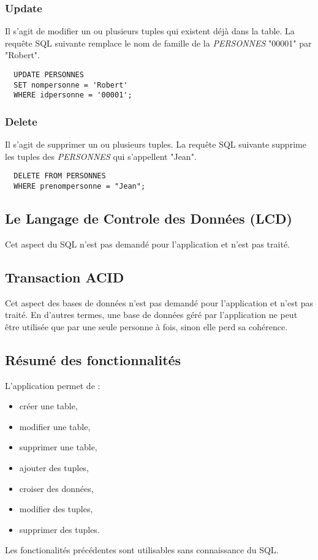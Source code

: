 \subsubsection{Update}
Il s'agit de modifier un ou plusieurs tuples qui existent déjà dans la table.
La requête SQL suivante remplace le nom de famille de la \textit{PERSONNES} "00001" par "Robert".
\begin{lstlisting}
  UPDATE PERSONNES
  SET nompersonne = 'Robert'
  WHERE idpersonne = '00001';
\end{lstlisting}

\subsubsection{Delete}
Il s'agit de supprimer un ou plusieurs tuples.
La requête SQL suivante supprime les tuples des \textit{PERSONNES} qui s'appellent "Jean".
\begin{lstlisting}
  DELETE FROM PERSONNES
  WHERE prenompersonne = "Jean";
\end{lstlisting}

\subsection{Le Langage de Controle des Données (LCD)}
Cet aspect du SQL n'est pas demandé pour l'application et n'est pas traité.

\subsection{Transaction ACID}
Cet aspect des bases de données n'est pas demandé pour l'application et n'est pas traité.
En d'autres termes, une base de données géré par l'application ne peut être utilisée que par une seule personne à fois, sinon elle perd sa cohérence.

\subsection{Résumé des fonctionnalités}
L'application permet de :
\begin{itemize}
\item créer une table,
\item modifier une table,
\item supprimer une table,
\item ajouter des tuples,
\item croiser des données,
\item modifier des tuples,
\item supprimer des tuples.
\end{itemize}

Les fonctionalités précédentes sont utilisables sans connaissance du SQL.
